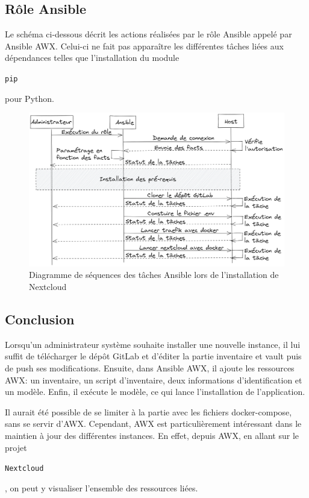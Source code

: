 \documentclass[12pt, a4paper, twoside]{article}
\begin{document}
\subsection{Rôle Ansible}
Le schéma ci-dessous décrit les actions réalisées par le rôle \gls{Ansible} appelé par \gls{Ansible} AWX. 
Celui-ci ne fait pas apparaître les différentes tâches liées aux dépendances telles que l'installation du module \begin{code}\texttt{pip}\end{code} pour Python.

\begin{figure}[!ht]
    \centering
    \includegraphics[width=\textwidth]{src/graph_ansible_nextcloud.png}
    \caption{Diagramme de séquences des tâches \gls{Ansible} lors de l'installation de \gls{Nextcloud}}
    \label{fig:nextcloud_ansible}
\end{figure}

\newpage
\subsection{Conclusion}
Lorsqu'un administrateur système souhaite installer une nouvelle instance, il lui suffit de télécharger le dépôt \gls{GitLab} et d'éditer la partie inventaire et vault puis de push ses modifications. 
Ensuite, dans \gls{Ansible} AWX, il ajoute les ressources AWX: un inventaire, un script d'inventaire, deux informations d'identification et un modèle. 
Enfin, il exécute le modèle, ce qui lance l'installation de l'application.

Il aurait été possible de se limiter à la partie avec les fichiers docker-compose, sans se servir d'AWX. 
Cependant, AWX est particulièrement intéressant dans le maintien à jour des différentes instances. 
En effet, depuis AWX, en allant sur le projet \begin{code}\texttt{\gls{Nextcloud}}\end{code}, on peut y visualiser l'ensemble des ressources liées.
\end{document}
